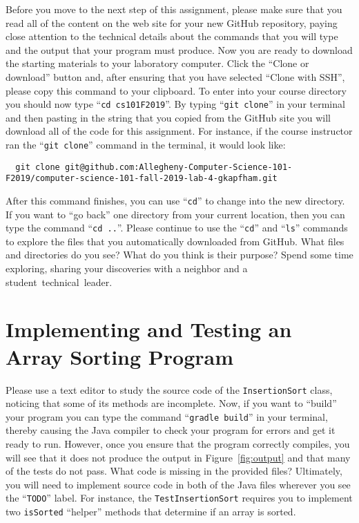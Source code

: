 \documentclass[11pt]{article}
\newcommand{\mainprogram}{\lstinline{InsertionSort}}
\newcommand{\testprogram}{\lstinline{TestInsertionSort}}
\newcommand{\gradlebuild}{\command{gradle build}}
\newcommand{\command}[1]{``\lstinline{#1}''}
\newcommand{\program}[1]{\lstinline{#1}}
\newcommand{\step}[1]{``{#1}''}
\begin{document}
Before you move to the next step of this assignment, please make sure that you
read all of the content on the web site for your new GitHub repository, paying
close attention to the technical details about the commands that you will type
and the output that your program must produce. Now you are ready to download the
starting materials to your laboratory computer. Click the ``Clone or download''
button and, after ensuring that you have selected ``Clone with SSH'', please
copy this command to your clipboard. To enter into your course directory you
should now type \command{cd cs101F2019}. By typing \command{git clone} in your
terminal and then pasting in the string that you copied from the GitHub site you
will download all of the code for this assignment. For instance, if the course
instructor ran the \command{git clone} command in the terminal, it would look
like:

\begin{lstlisting}
  git clone git@github.com:Allegheny-Computer-Science-101-F2019/computer-science-101-fall-2019-lab-4-gkapfham.git
\end{lstlisting}

After this command finishes, you can use \command{cd} to change into the new
directory. If you want to \step{go back} one directory from your current
location, then you can type the command \command{cd ..}. Please continue to use
the \command{cd} and \command{ls} commands to explore the files that you
automatically downloaded from GitHub. What files and directories do you see?
What do you think is their purpose? Spend some time exploring, sharing your
discoveries with a neighbor and a \mbox{student technical leader}.

\section*{Implementing and Testing an Array Sorting Program}

Please use a text editor to study the source code of the \mainprogram{} class,
noticing that some of its methods are incomplete. Now, if you want to
\step{build} your program you can type the command \gradlebuild{} in your
terminal, thereby causing the Java compiler to check your program for errors and
get it ready to run. However, once you ensure that the program correctly
compiles, you will see that it does not produce the output in
Figure~\ref{fig:output} and that many of the tests do not pass. What code is
missing in the provided files?
%
Ultimately, you will need to implement source code in both of the Java files
wherever you see the \command{TODO} label. For instance, the \testprogram{}
requires you to implement two \program{isSorted} ``helper'' methods that
determine if an array is sorted.
\end{document}
